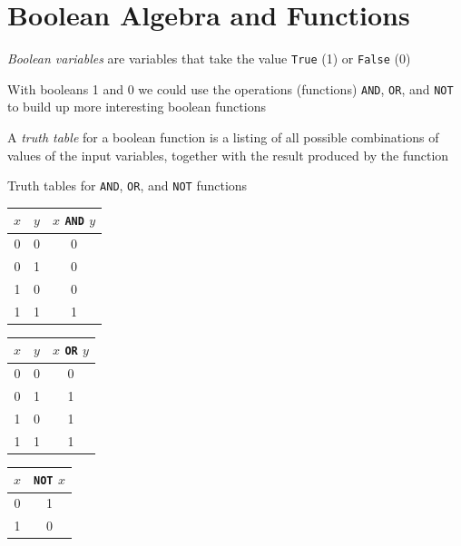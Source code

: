 \documentclass[8pt,a4paper,compress]{beamer}
\begin{document}
\section{Boolean Algebra and Functions}
\begin{frame}[fragile]
\emph{Boolean variables} are variables that take the value \lstinline{True} (1) or \lstinline{False} (0)

\bigskip

With booleans 1 and 0 we could use the operations (functions) \lstinline{AND}, \lstinline{OR}, and \lstinline{NOT} to build up more interesting boolean functions

\bigskip

A \emph{truth table} for a boolean function is a listing of all possible combinations of values of the input variables, together with the result produced by the function

\bigskip

Truth tables for \lstinline{AND}, \lstinline{OR}, and \lstinline{NOT} functions

\begin{center}
\begin{tabular}{cc|c}
$x$ & $y$ & $x$ \lstinline$AND$ $y$ \\ \hline
0 & 0 & 0 \\
0 & 1 & 0 \\
1 & 0 & 0 \\
1 & 1 & 1
\end{tabular}\hspace{1cm} \begin{tabular}{cc|c}
$x$ & $y$ & $x$ \lstinline$OR$ $y$ \\ \hline
0 & 0 & 0 \\
0 & 1 & 1 \\
1 & 0 & 1 \\
1 & 1 & 1
\end{tabular}\hspace{1cm} \begin{tabular}{c|c}
$x$ & \lstinline$NOT$ $x$ \\ \hline
0 & 1 \\
1 & 0
\end{tabular}
\end{center}
\end{frame}
\end{document}
